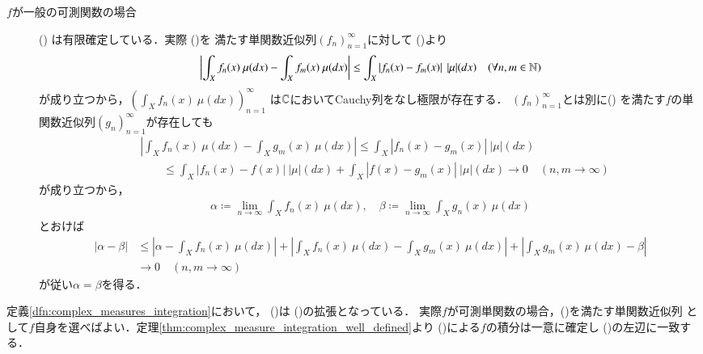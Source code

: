 \begin{prf}
\begin{description}
			\item[$f$が一般の可測関数の場合]
				()
				は有限確定している．実際
				()を
				満たす単関数近似列$(f_n)_{n=1}^{\infty}$に対して
				()より
				\begin{align}
					\left| \int_X f_n(x)\ \mu(dx) - \int_X f_m(x)\ \mu(dx) \right|
					\leq \int_X \left| f_n(x) - f_m(x) \right|\ |\mu|(dx)
					\quad (\forall n,m \in \N)
				\end{align}
				が成り立つから，$\left( \int_X f_n(x)\ \mu(dx) \right)_{n=1}^{\infty}$
				は$\mathbb{C}$においてCauchy列をなし極限が存在する．
				$(f_n)_{n=1}^{\infty}$とは別に()
				を満たす$f$の単関数近似列$(g_n)_{n=1}^{\infty}$が存在しても
				\begin{align}
					&\left| \int_X f_n(x)\ \mu(dx) - \int_X g_m(x)\ \mu(dx) \right|
					\leq \int_X \left| f_n(x) - g_m(x) \right|\ |\mu|(dx) \\
					&\qquad \leq \int_X \left| f_n(x) - f(x) \right|\ |\mu|(dx)
						+ \int_X \left| f(x) - g_m(x) \right|\ |\mu|(dx)
					\longrightarrow 0 \quad (n,m \longrightarrow \infty)
				\end{align}
				が成り立つから，
				\begin{align}
					\alpha \coloneqq \lim_{n \to \infty} \int_X f_n(x)\ \mu(dx),
					\quad \beta \coloneqq \lim_{n \to \infty} \int_X g_n(x)\ \mu(dx)
				\end{align}
				とおけば
				\begin{align}
					|\alpha - \beta|
					&\leq \left| \alpha - \int_X f_n(x)\ \mu(dx) \right|
						+ \left| \int_X f_n(x)\ \mu(dx) - \int_X g_m(x)\ \mu(dx) \right|
						+ \left| \int_X g_m(x)\ \mu(dx) - \beta \right| \\
					&\longrightarrow 0 \quad (n,m \longrightarrow \infty)
				\end{align}
				が従い$\alpha = \beta$を得る．
				\QED
		\end{description}
	\end{prf}
	
	定義\ref{dfn:complex_measures_integration}において，
	()は
	()の拡張となっている．
	実際$f$が可測単関数の場合，()を満たす単関数近似列
	として$f$自身を選べばよい．定理\ref{thm:complex_measure_integration_well_defined}より
	()による$f$の積分は一意に確定し
	()の左辺に一致する．
	

